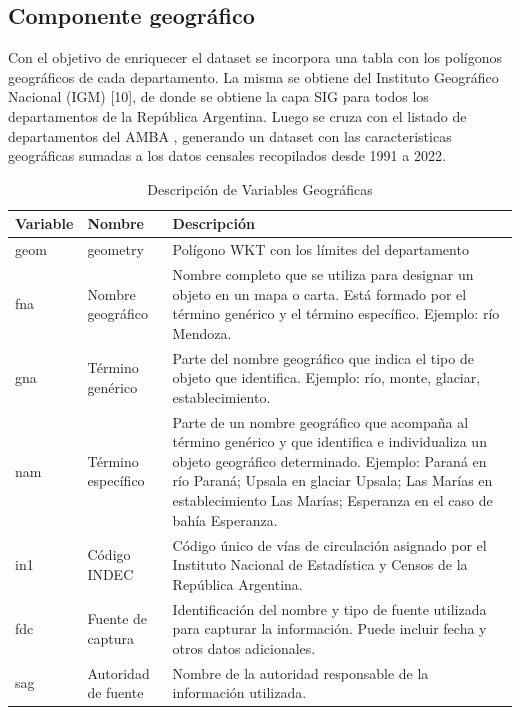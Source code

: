 \documentclass{article}
\theoremstyle{mytheoremstyle}
\theoremstyle{mytheoremstyle}
\theoremstyle{myproblemstyle}
\begin{document}
\subsection{Componente geográfico }
Con el objetivo de enriquecer el dataset se incorpora una tabla con los polígonos geográficos de cada departamento.
 La misma se obtiene del Instituto Geográfico Nacional (IGM) [10], de donde se obtiene la capa SIG para 
 todos los departamentos de la República Argentina. Luego se cruza con el listado de departamentos del AMBA , generando un dataset con las caracteristicas geográficas 
 sumadas a  los datos censales recopilados desde 1991 a 2022.

\begin{table}[htbp]
    \centering
    \caption{Descripción de Variables Geográficas}
    \begin{tabular}{|l|l|p{8cm}|}
        \hline
        \textbf{Variable} & \textbf{Nombre} & \textbf{Descripción} \\
        \hline
        geom & geometry & Polígono WKT con los límites del departamento \\
        fna & Nombre geográfico & Nombre completo que se utiliza para designar un objeto en un mapa o carta. Está formado por el término genérico y el término específico. Ejemplo: río Mendoza. \\
        gna & Término genérico & Parte del nombre geográfico que indica el tipo de objeto que identifica. Ejemplo: río, monte, glaciar, establecimiento. \\
        nam & Término específico & Parte de un nombre geográfico que acompaña al término genérico y que identifica e individualiza un objeto geográfico determinado. Ejemplo: Paraná en río Paraná; Upsala en glaciar Upsala; Las Marías en establecimiento Las Marías; Esperanza en el caso de bahía Esperanza. \\
        in1 & Código INDEC & Código único de vías de circulación asignado por el Instituto Nacional de Estadística y Censos de la República Argentina. \\
        fdc & Fuente de captura & Identificación del nombre y tipo de fuente utilizada para capturar la información. Puede incluir fecha y otros datos adicionales. \\
        sag & Autoridad de fuente & Nombre de la autoridad responsable de la información utilizada. \\
        \hline
    \end{tabular}
    \label{tab:geo.depto}
\end{table}
\end{document}
